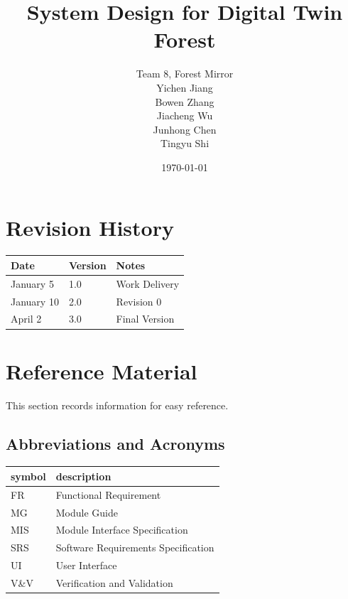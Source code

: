 \documentclass[12pt, titlepage]{article}
\begin{document}
\title{System Design for Digital Twin Forest} 
\author{Team 8, Forest Mirror\\Yichen Jiang\\ Bowen Zhang\\ Jiacheng Wu\\ Junhong Chen\\ Tingyu Shi}

\date{\today}

\maketitle


\section{Revision History}

\begin{tabularx}{\textwidth}{p{3cm}p{2cm}X}
\toprule {\bf Date} & {\bf Version} & {\bf Notes}\\
\midrule
January 5 & 1.0 & Work Delivery\\
\hline
January 10 & 2.0 & Revision 0\\
\hline
April 2 & 3.0 & Final Version\\
\bottomrule
\end{tabularx}

\newpage

\section{Reference Material}

This section records information for easy reference.

\subsection{Abbreviations and Acronyms}

\renewcommand{\arraystretch}{1.2}
\begin{tabular}{l l} 
  \toprule		
  \textbf{symbol} & \textbf{description}\\
  \midrule 
  FR & Functional Requirement\\
  MG & Module Guide \\
  MIS &  Module Interface Specification\\
  SRS & Software Requirements Specification\\
  UI & User Interface\\
  V\&V & Verification and Validation\\
 
  
  
  \bottomrule
\end{tabular}\\
\end{document}
